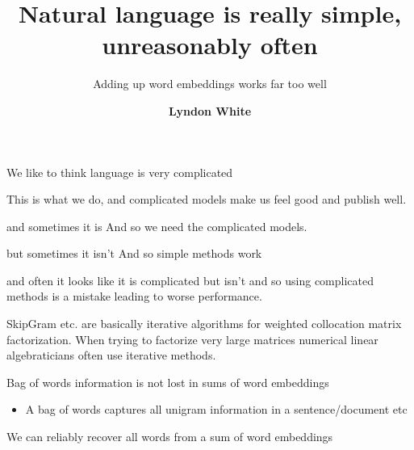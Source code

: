 \documentclass[dvipsnames]{beamer}
\institute{School of Electical, Electronic and Computer Engineering\\The University of Western Australia}
\date{}
\title{Natural language is really simple, unreasonably often}
\subtitle{Adding up word embeddings works far too well}
\author{
	\textbf{Lyndon White}}
\newcommand{\countertitle}[1]{{\centering \Large \color{bluewrite} #1}}
\begin{document}
\centering %
\frame{\maketitle}
\logo{}



\begin{frame}{We like to think language is very complicated}
	
	\countertitle{This is what we do, and complicated models make us feel good and publish well.}
\end{frame}

\begin{frame}{and sometimes it is}
	\countertitle{And so we need the complicated models.}
\end{frame}

\begin{frame}{but sometimes it isn't}
	\countertitle{And so simple methods work}
\end{frame}

\begin{frame}{and often it looks like it is complicated but isn't}
	\countertitle{and so using complicated methods is a mistake leading to worse performance.}
\end{frame}


\begin{frame}{SkipGram etc. are basically iterative algorithms for weighted collocation matrix factorization.}
	\countertitle{When trying to factorize very large matrices numerical linear algebraticians often use iterative methods.}
\end{frame}



\begin{frame}{Bag of words information is not lost in sums of word embeddings}
	\begin{itemize}
		\item A bag of words captures all unigram information in a sentence/document etc
		
	\end{itemize}
	\countertitle{We can reliably recover all words from a sum of word embeddings}
\end{frame}
\end{document}
